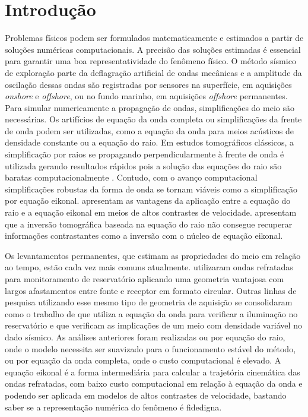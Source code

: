 \chapter{Introdução}
\label{ch:introducao}

Problemas físicos podem ser formulados matematicamente e estimados a partir de soluções numéricas computacionais. A precisão das soluções estimadas é essencial para garantir uma boa representatividade do fenômeno físico. O método sísmico de exploração parte da deflagração artificial de ondas mecânicas e a amplitude da oscilação dessas ondas são registradas por sensores na superfície, em aquisições \textit{onshore} e \textit{offshore}, ou no fundo marinho, em aquisições \textit{offshore} permanentes. Para simular numericamente a propagação de ondas, simplificações do meio são necessárias. Os artifícios de equação da onda completa ou simplificações da frente de onda podem ser utilizadas, como a equação da onda para meios acústicos de densidade constante ou a equação do raio. Em estudos tomográficos clássicos, a simplificação por raios se propagando perpendicularmente à frente de onda é utilizada gerando resultados rápidos pois a solução das equações do raio são baratas computacionalmente \cite{zhang1998nonlinear}. Contudo, com o avanço computacional simplificações robustas da forma de onda se tornam viáveis como a simplificação por equação eikonal.  apresentam as vantagens da aplicação entre a equação do raio e a equação eikonal em meios de altos contrastes de velocidade.  apresentam que a inversão tomográfica baseada na equação do raio não consegue recuperar informações contrastantes como a inversão com o núcleo de equação eikonal.  

Os levantamentos permanentes, que estimam as propriedades do meio em relação ao tempo, estão cada vez mais comuns atualmente.  utilizaram ondas refratadas para monitoramento de reservatório aplicando uma geometria vantajosa com largos afastamentos entre fonte e receptor em formato circular. Outras linhas de pesquisa utilizando esse mesmo tipo de geometria de aquisição se consolidaram como o trabalho de  que utiliza a equação da onda para verificar a iluminação no reservatório e  que verificam as implicações de um meio com densidade variável no dado sísmico. As análises anteriores foram realizadas ou por equação do raio, onde o modelo necessita ser suavizado para o funcionamento estável do método, ou por equação da onda completa, onde o custo computacional é elevado. A equação eikonal é a forma intermediária para calcular a trajetória cinemática das ondas refratadas, com baixo custo computacional em relação à equação da onda e podendo ser aplicada em modelos de altos contrastes de velocidade, bastando saber se a representação numérica do fenômeno é fidedigna. 


